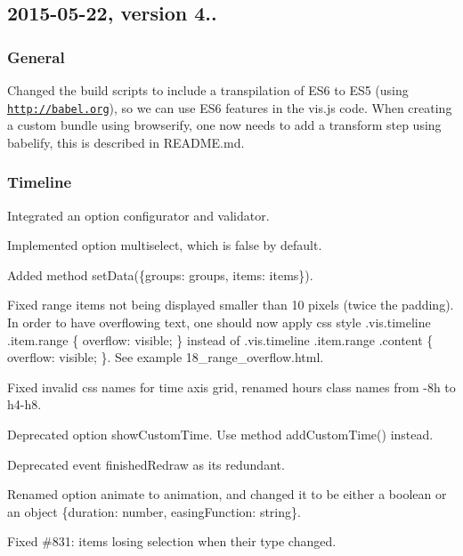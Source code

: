 \subsection*{2015-\/05-\/22, version 4..}

\subsubsection*{General}


\begin{DoxyItemize}
\item Changed the build scripts to include a transpilation of E\+S6 to E\+S5 (using \href{http://babel.org}{\tt http\+://babel.\+org}), so we can use E\+S6 features in the vis.\+js code. When creating a custom bundle using browserify, one now needs to add a transform step using {\ttfamily babelify}, this is described in R\+E\+A\+D\+M\+E.\+md.
\end{DoxyItemize}

\subsubsection*{Timeline}


\begin{DoxyItemize}
\item Integrated an option configurator and validator.
\item Implemented option {\ttfamily multiselect}, which is false by default.
\item Added method {\ttfamily set\+Data(\{groups\+: groups, items\+: items\})}.
\item Fixed range items not being displayed smaller than 10 pixels (twice the padding). In order to have overflowing text, one should now apply css style {\ttfamily .vis.\+timeline .item.\+range \{ overflow\+: visible; \}} instead of {\ttfamily .vis.\+timeline .item.\+range .content \{ overflow\+: visible; \}}. See example 18\+\_\+range\+\_\+overflow.\+html.
\item Fixed invalid css names for time axis grid, renamed hours class names from {-\/8h} to {\ttfamily h4-\/h8}.
\item Deprecated option {\ttfamily show\+Custom\+Time}. Use method {\ttfamily add\+Custom\+Time()} instead.
\item Deprecated event {\ttfamily finished\+Redraw} as it\textquotesingle{}s redundant.
\item Renamed option {\ttfamily animate} to {\ttfamily animation}, and changed it to be either a boolean or an object {\ttfamily \{duration\+: number, easing\+Function\+: string\}}.
\item Fixed \#831\+: items losing selection when their type changed.
\end{DoxyItemize}

